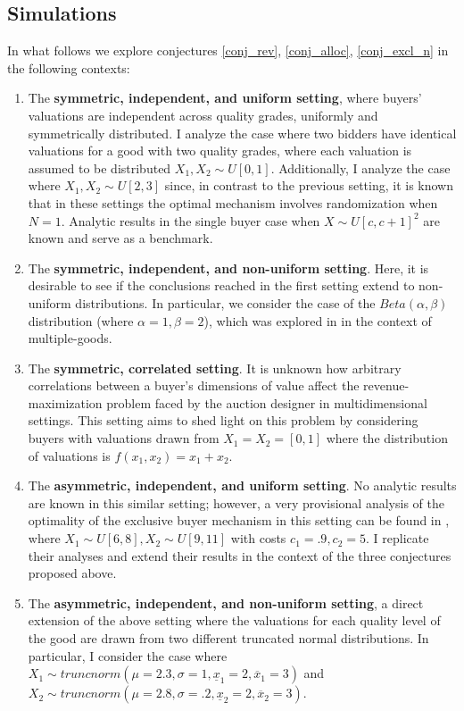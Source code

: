 \subsection{Simulations}\label{subsec_sim}

In what follows we explore conjectures \ref{conj_rev}, \ref{conj_alloc}, \ref{conj_excl_n} in the following contexts:

\begin{enumerate}
    \item The \textbf{symmetric, independent, and uniform setting}, where buyers' valuations are independent across quality grades, uniformly and symmetrically distributed. I analyze the case where two bidders have identical valuations for a good with two quality grades, where each valuation is assumed to be distributed $X_1,X_2 \sim U[0,1]$. Additionally, I analyze the case where $X_1,X_2 \sim U[2,3]$ since, in contrast to the previous setting, it is known that in these settings the optimal mechanism involves randomization when $N=1$. Analytic results in the single buyer case when $X \sim U[c,c+1]^2$ are known \autocite{pavlov2011optimal} and serve as a benchmark.

    \item The \textbf{symmetric, independent, and non-uniform setting}. Here, it is desirable to see if the conclusions reached in the first setting extend to non-uniform distributions. In particular, we consider the case of the $Beta(\alpha,\beta)$ distribution (where $\alpha=1,\beta=2$), which was explored in \autocite{daskalakis2017strong} in the context of multiple-goods.  

    \item The \textbf{symmetric, correlated setting}. It is unknown how arbitrary correlations between a buyer's dimensions of value affect the revenue-maximization problem faced by the auction designer in multidimensional settings. This setting aims to shed light on this problem by considering buyers with valuations drawn from $X_1 = X_2 = [0,1]$ where the distribution of valuations is $f(x_1,x_2) = x_1 + x_2$.

    \item The \textbf{asymmetric, independent, and uniform setting}. No analytic results are known in this similar setting; however, a very provisional analysis of the optimality of the exclusive buyer mechanism in this setting can be found in \autocite{belloni2010multidimensional}, where $X_1 \sim U[6,8], X_2 \sim U[9,11]$ with costs $c_1 = .9, c_2 = 5$. I replicate their analyses and extend their results in the context of the three conjectures proposed above.

    \item The \textbf{asymmetric, independent, and non-uniform setting}, a direct extension of the above setting where the valuations for each quality level of the good are drawn from two different truncated normal distributions. In particular, I consider the case where $X_1 \sim truncnorm(\mu=2.3, \sigma=1, \underline{x}_1=2, \overline{x}_1=3)$ and $X_2 \sim truncnorm(\mu=2.8, \sigma=.2, \underline{x}_2=2, \overline{x}_2=3)$.
\end{enumerate}




